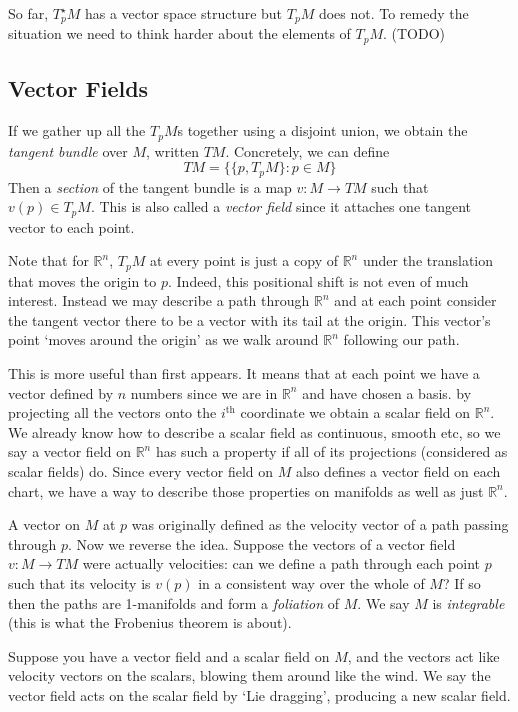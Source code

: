 \documentclass[oneside,english]{amsbook}
\numberwithin{section}{chapter}
\theoremstyle{plain}
\theoremstyle{definition}
\begin{document}
So far, $T_p^\star M$ has a vector space structure but $T_p M$ does not. To remedy the situation we need to think harder about the elements of $T_p M$. (TODO)



\subsection{Vector Fields}

If we gather up all the $T_p M$s together using a disjoint union, we obtain the \emph{tangent bundle} over $M$, written $TM$. Concretely, we can define
\[
	TM = \{ \{p, T_p M\} :  p\in M\}
\]
Then a \emph{section} of the tangent bundle is a map $v:M\to TM$ such that $v(p)\in T_p M$. This is also called a \emph{vector field} since it attaches one tangent vector to each point.

Note that for $\mathbb{R}^n$, $T_p M$ at every point is just a copy of $\mathbb{R}^n$ under the translation that moves the origin to $p$. Indeed, this positional shift is not even of much interest. Instead we may describe a path through $\mathbb{R}^n$ and at each point consider the tangent vector there to be a vector with its tail at the origin. This vector's point `moves around the origin' as we walk around $\mathbb{R}^n$ following our path.

This is more useful than first appears. It means that at each point we have a vector defined by $n$ numbers since we are in $\mathbb{R}^n$ and have chosen a basis. by projecting all the vectors onto the $i^{\text{th}}$ coordinate we obtain a scalar field on $\mathbb{R}^n$. We already know how to describe a scalar field as continuous, smooth etc, so we say a vector field on $\mathbb{R}^n$ has such a property if all of its projections (considered as scalar fields) do. Since every vector field on $M$ also defines a vector field on each chart, we have a way to describe those properties on manifolds as well as just $\mathbb{R}^n$.

A vector on $M$ at $p$ was originally defined as the velocity vector of a path passing through $p$. Now we reverse the idea. Suppose the vectors of a vector field $v: M\to TM$ were actually velocities: can we define a path through each point $p$ such that its velocity is $v(p)$ in a consistent way over the whole of $M$? If so then the paths are 1-manifolds and form a \emph{foliation} of $M$. We say $M$ is \emph{integrable} (this is what the Frobenius theorem is about).

Suppose you have a vector field and a scalar field on $M$, and the vectors act like velocity vectors on the scalars, blowing them around like the wind. We say the vector field acts on the scalar field by `Lie dragging', producing a new scalar field.
\end{document}
